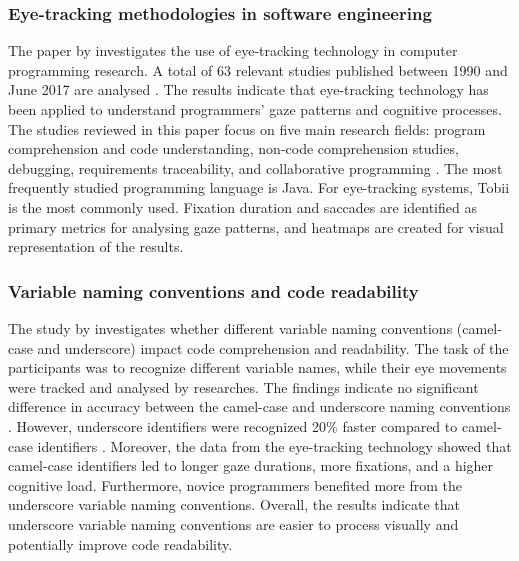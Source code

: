 \subsubsection{Eye-tracking methodologies in software engineering}
The paper by \citet{obaidellah2018survey} investigates the use of eye-tracking technology in computer programming research. A total of 63 relevant studies published between 1990 and June 2017 are analysed \cite{obaidellah2018survey}. The results indicate that eye-tracking technology has been applied to understand programmers' gaze patterns and cognitive processes. The studies reviewed in this paper focus on five main research fields: program comprehension and code understanding, non-code comprehension studies, debugging, requirements traceability, and collaborative programming \cite{obaidellah2018survey}.  The most frequently studied programming language is Java.  
For eye-tracking systems, Tobii is the most commonly used.  Fixation duration and saccades are identified as primary metrics for analysing gaze patterns, and heatmaps are created for visual representation of the results.


\subsubsection{Variable naming conventions and code readability}

The study by \citet{sharif2010eye} investigates whether different variable naming conventions (camel-case and underscore) impact code comprehension and readability.
The task of the participants was to recognize different variable names, while their eye movements were tracked and analysed by researches. 
The findings indicate no significant difference in accuracy between the camel-case and underscore naming conventions \cite{sharif2010eye}. However, underscore identifiers were recognized 20\% faster compared to camel-case identifiers \cite{sharif2010eye}. Moreover, the data from the eye-tracking technology showed that camel-case identifiers led to longer gaze durations, more fixations, and a   higher cognitive load. Furthermore, novice programmers benefited more from the underscore variable naming conventions.   
Overall, the results indicate that underscore variable naming conventions are easier to process visually and potentially improve code readability.   


